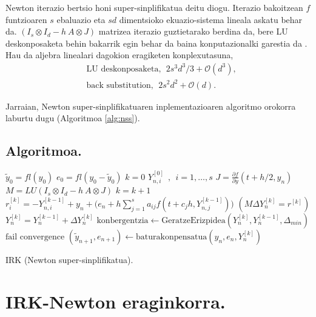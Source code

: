 Newton iterazio bertsio honi super-sinplifikatua deitu diogu. Iterazio bakoitzean $f$ funtzioaren $s$ ebaluazio eta $sd$ dimentsioko ekuazio-sistema lineala askatu behar da. $(I_s \otimes I_d - h \ A \otimes J)$ matrizea iterazio guztietarako berdina da,  bere LU deskonposaketa behin bakarrik egin behar da baina konputazionalki garestia da \cite{Butcher1976} \cite{Hairer1996}. Hau da aljebra linealari dagokion eragiketen konplexutasuna,
\begin{align*}
&\text{LU deskonposaketa}, \ \ 2s^3d^3/3+\mathcal{O}(d^3), \\
&\text{back substitution}, \ \ 2s^2d^2+\mathcal{O}(d).
\end{align*}

Jarraian, Newton super-sinplifikatuaren inplementazioaren algoritmo orokorra laburtu dugu (Algoritmoa \ref{alg:nss}).

\subsection*{Algoritmoa.}

\begin{algorithm}[H]
 \BlankLine
  $\tilde{y}_0=fl(y_0)$\;
  $e_0=fl(y_0-\tilde{y}_0)$\;
  {
   \BlankLine
   $k=0$\;
    $Y_{n,i}^{[0]} \ \ , \ \ i=1,\dots,s $\;
   \BlankLine
   $J=\frac{\partial f}{\partial y}(t+h/2,y_n) $\; 
   $M=LU(I_s \otimes I_d - h \ A \otimes J)$\;
   \BlankLine
   {
    \BlankLine 
    $k=k+1$\;
    $r_i^{[k]}=-Y_{n,i}^{[k-1]}+y_n+\big(e_n+h \sum\limits_{j=1}^{s} a_{ij} f(t+c_jh,Y_{n,j}^{[k-1]})\big) $\;
     $(M \Delta Y_n^{[k]}=r^{[k]})$\;
    $Y_n^{[k]}=Y_n^{[k-1]}+\Delta Y_n^{[k]}$\;
    $\text{konbergentzia} \leftarrow \text{GeratzeErizpidea}(Y_n^{[k]},Y_n^{[k-1]},\Delta_{min}) $\;
   }
   \BlankLine
   {
     {$\text{fail convergence}$\;}
   }
   {$(\tilde y_{n+1},e_{n+1})\leftarrow \text{baturakonpensatua}(y_n,e_n,Y_n^{[k]})$\;}    
 }
 \caption{IRK (Newton super-sinplifikatua).}
 \label{alg:nss}
\end{algorithm}



\section{IRK-Newton eraginkorra.}
\label{sec:s74}

